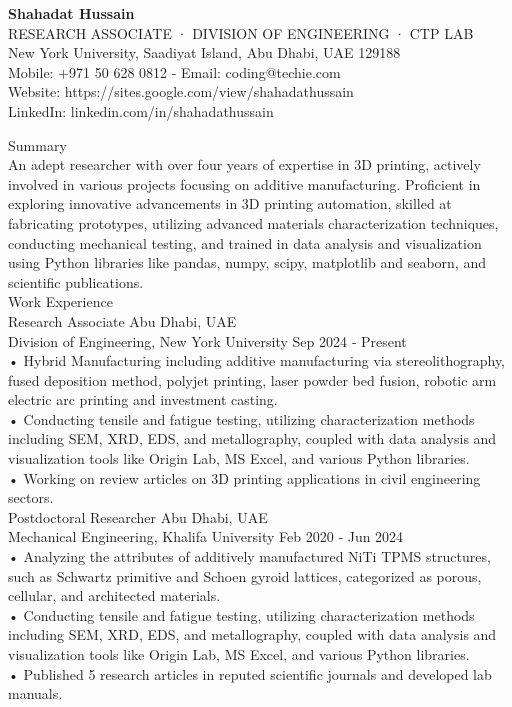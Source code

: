 \documentclass[a4paper]{article}
\begin{document}
\begin{center}

\textbf{\LARGE Shahadat Hussain}\\

RESEARCH ASSOCIATE · DIVISION OF ENGINEERING · CTP LAB\\
New York University, Saadiyat Island, Abu Dhabi, UAE 129188\\

Mobile: +971 50 628 0812 - Email: coding@techie.com\\
Website: https://sites.google.com/view/shahadathussain\\
LinkedIn: linkedin.com/in/shahadathussain\\

\end{center}

Summary\\
An adept researcher with over four years of expertise in 3D printing, actively involved in various projects focusing on additive
manufacturing. Proficient in exploring innovative advancements in 3D printing automation, skilled at fabricating
prototypes, utilizing advanced materials characterization techniques, conducting mechanical testing, and trained in
data analysis and visualization using Python libraries like pandas, numpy, scipy, matplotlib and seaborn, and scientific
publications.\\

Work Experience\\
Research Associate Abu Dhabi, UAE\\
Division of Engineering, New York University Sep 2024 ‑ Present\\
• Hybrid Manufacturing including additive manufacturing via stereolithography, fused deposition method, polyjet
printing, laser powder bed fusion, robotic arm electric arc printing and investment casting.\\
• Conducting tensile and fatigue testing, utilizing characterization methods including SEM, XRD, EDS, and metallography,
coupled with data analysis and visualization tools like Origin Lab, MS Excel, and various Python libraries.\\
• Working on review articles on 3D printing applications in civil engineering sectors.\\

Postdoctoral Researcher Abu Dhabi, UAE\\
Mechanical Engineering, Khalifa University Feb 2020 ‑ Jun 2024\\
• Analyzing the attributes of additively manufactured NiTi TPMS structures, such as Schwartz primitive and Schoen
gyroid lattices, categorized as porous, cellular, and architected materials.\\
• Conducting tensile and fatigue testing, utilizing characterization methods including SEM, XRD, EDS, and metallography,
coupled with data analysis and visualization tools like Origin Lab, MS Excel, and various Python libraries.\\
• Published 5 research articles in reputed scientific journals and developed lab manuals.\\
\end{document}
